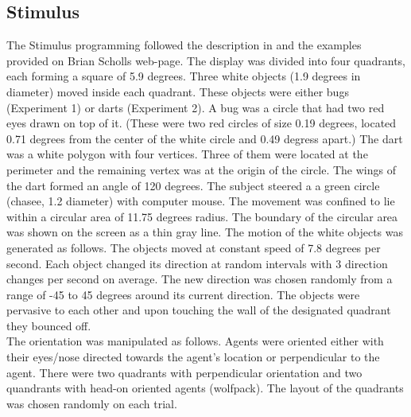 \documentclass[10pt]{article}
\begin{document}
\subsection*{Stimulus}
The Stimulus programming followed the description in \cite{gao10} and the examples provided on Brian Scholls web-page. 
The display was divided into four quadrants, each forming a square of 5.9 degrees. 
Three white objects (1.9 degrees in diameter) moved inside each quadrant. 
These objects were either bugs (Experiment 1) or darts (Experiment 2). 
A bug was a circle that had two red eyes drawn on top of it. 
(These were two red circles of size 0.19 degrees, located 0.71 degrees from the center of the white circle and 0.49 degress apart.) 
The dart was a white polygon with four vertices. 
Three of them were located at the perimeter and the remaining vertex was at the origin of the circle. 
The wings of the dart formed an angle of 120 degrees.
The subject steered a a green circle (chasee, 1.2 diameter) with computer mouse. 
The movement was confined to lie within a circular area of 11.75 degrees radius. 
The boundary of the circular area was shown on the screen as a thin gray line. 
The motion of the white objects was generated as follows. 
The objects moved at constant speed of 7.8 degrees per second. 
Each object changed its direction at random intervals with 3 direction changes per second on average. 
The new direction was chosen randomly from a range of -45 to 45 degrees around its current direction. 
The objects were pervasive to each other and upon touching the wall of the designated quadrant they bounced off. \\
The orientation was manipulated as follows. 
Agents were oriented either with their eyes/nose directed towards the agent's location or perpendicular to the agent. 
There were two quadrants with perpendicular orientation and two quandrants with head-on oriented agents (wolfpack). 
The layout of the quadrants was chosen randomly on each trial. \\
\end{document}
